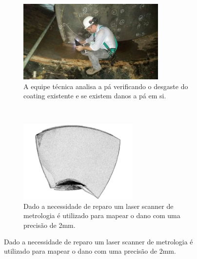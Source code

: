 \begin{figure}[H]
\begin{subfigure}{0.5\textwidth}
\includegraphics[width=0.9\linewidth, height=4.1cm]{figs/manolo}
\captionsetup{width=0.9\textwidth}
\caption{A equipe técnica analisa a pá verificando o desgaste do coating
existente e se existem danos a pá em si.}
\label{fig:subim1}
\end{subfigure}
~
\begin{subfigure}{0.5\textwidth}
\label{fig:subim2}
\includegraphics[width=0.9\linewidth, height=4.1cm]{figs/modelo_pa_faro}
\captionsetup{width=0.9\textwidth}
\caption{Dado a necessidade de reparo um laser scanner de metrologia é
utilizado para mapear o dano com uma precisão de 2mm.}
\end{subfigure}
 \label{fig:image2}
\end{figure}


